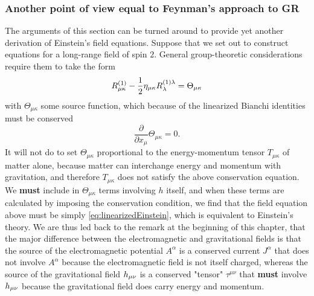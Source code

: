 \subsubsection{Another point of view equal to Feynman's approach to GR}
The arguments of this section can be turned around to provide yet another derivation of Einstein's field equations. Suppose that we set out to construct equations for a long-range field of spin $2$. General group-theoretic considerations require them to take the form
\begin{equation}
	R^{(1)}_{\mu \kappa} - \frac{1}{2} \eta_{\mu \kappa} R^{(1)\lambda}_\lambda = \Theta_{\mu \kappa}
\end{equation}
with $\Theta_{\mu \kappa}$ some source function, which because of the linearized Bianchi identities must be conserved
\begin{equation}
	\frac{\partial}{\partial x_\mu} \Theta_{\mu \kappa} = 0.
\end{equation}
It will not do to set $\Theta_{\mu \kappa}$ proportional to the energy-momentum tensor $T_{\mu\kappa}$ of matter alone, because matter can interchange energy and momentum with gravitation, and therefore $T_{\mu \kappa}$ does not satisfy the above conservation equation. We \textbf{must} include in $\Theta_{\mu \kappa}$ terms involving $h$ itself, and when these terms are calculated by imposing the conservation condition, we find that the field equation above must be simply \ref{eq:linearizedEinstein}, which is equivalent to Einstein's theory. We are thus led back to the remark at the beginning of this chapter, that the major difference between the electromagnetic and gravitational fields is that the source of the electromagnetic potential $A^\alpha$ is a conserved current $J^\alpha$ that does not involve $A^\alpha$ because the electromagnetic field is not itself charged, whereas the source of the gravitational field $h_{\mu \nu}$ is a conserved "tensor" $\tau^{\mu \nu}$ that \textbf{must} involve $h_{\mu \nu}$ because the gravitational field does carry energy and momentum.











